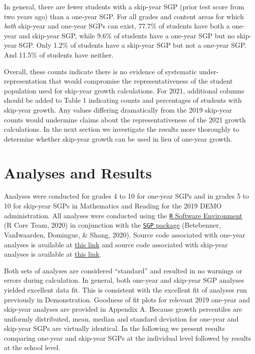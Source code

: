 \documentclass[12pt]{article}
\begin{document}
In general, there are fewer students with a skip-year SGP (prior test
score from two years ago) than a one-year SGP. For all grades and
content areas for which \emph{both} skip-year and one-year SGPs can
exist, 77.7\% of students have both a one-year and skip-year SGP, while
9.6\% of students have a one-year SGP but no skip-year SGP. Only 1.2\%
of students have a skip-year SGP but not a one-year SGP. And 11.5\% of
students have neither.

Overall, these counts indicate there is no evidence of systematic
under-representation that would compromise the representativeness of the
student population used for skip-year growth calculations. For 2021,
additional columns should be added to Table 1 indicating counts and
percentages of students with skip-year growth. Any values differing
dramatically from the 2019 skip-year counts would undermine claims about
the representativeness of the 2021 growth calculations. In the next
section we investigate the results more thoroughly to determine whether
skip-year growth can be used in lieu of one-year growth.

\hypertarget{analyses-and-results}{%
\section{Analyses and Results}\label{analyses-and-results}}

Analyses were conducted for grades 4 to 10 for one-year SGPs and in
grades 5 to 10 for skip-year SGPs in Mathematics and Reading for the
2019 DEMO administration. All analyses were conducted using the
\href{http://www.r-project.org/}{\texttt{R} Software Environment} (R
Core Team, 2020) in conjunction with the
\href{https://github.com/CenterForAssessment/SGP}{\texttt{SGP} package}
(Betebenner, VanIwaarden, Domingue, \& Shang, 2020). Source code
associated with one-year analyses is available at
\href{https://github.com/CenterForAssessment/Demonstration}{this link}
and source code associated with skip-year analyses is available at
\href{https://github.com/CenterForAssessment/SGP_Research/tree/master/Demonstration/Skip_Year_Analysis}{this
link}.

Both sets of analyses are considered ``standard'' and resulted in no
warnings or errors during calculation. In general, both one-year and
skip-year SGP analyses yielded excellent data fit. This is consistent
with the excellent fit of analyses run previously in Demonstration.
Goodness of fit plots for relevant 2019 one-year and skip-year analyses
are provided in Appendix A. Because growth percentiles are uniformly
distributed, mean, median and standard deviation for one-year and
skip-year SGPs are virtually identical. In the following we present
results comparing one-year and skip-year SGPs at the individual level
followed by results at the school level.
\end{document}
